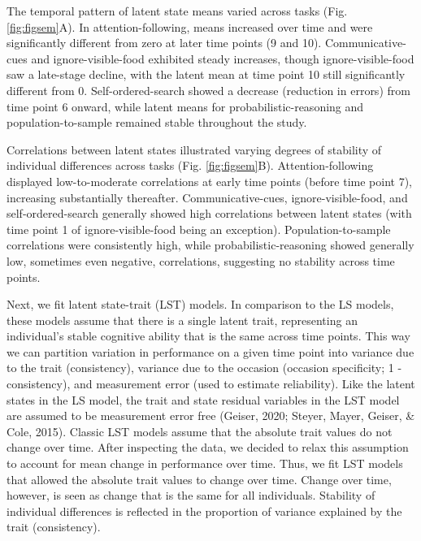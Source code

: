 \documentclass[
  man,floatsintext]{apa6}
\begin{document}
The temporal pattern of latent state means varied across tasks (Fig. \ref{fig:figsem}A). In attention-following, means increased over time and were significantly different from zero at later time points (9 and 10). Communicative-cues and ignore-visible-food exhibited steady increases, though ignore-visible-food saw a late-stage decline, with the latent mean at time point 10 still significantly different from 0. Self-ordered-search showed a decrease (reduction in errors) from time point 6 onward, while latent means for probabilistic-reasoning and population-to-sample remained stable throughout the study.

Correlations between latent states illustrated varying degrees of stability of individual differences across tasks (Fig. \ref{fig:figsem}B). Attention-following displayed low-to-moderate correlations at early time points (before time point 7), increasing substantially thereafter. Communicative-cues, ignore-visible-food, and self-ordered-search generally showed high correlations between latent states (with time point 1 of ignore-visible-food being an exception). Population-to-sample correlations were consistently high, while probabilistic-reasoning showed generally low, sometimes even negative, correlations, suggesting no stability across time points.

Next, we fit latent state-trait (LST) models. In comparison to the LS models, these models assume that there is a single latent trait, representing an individual's stable cognitive ability that is the same across time points. This way we can partition variation in performance on a given time point into variance due to the trait (consistency), variance due to the occasion (occasion specificity; 1 - consistency), and measurement error (used to estimate reliability). Like the latent states in the LS model, the trait and state residual variables in the LST model are assumed to be measurement error free (Geiser, 2020; Steyer, Mayer, Geiser, \& Cole, 2015). Classic LST models assume that the absolute trait values do not change over time. After inspecting the data, we decided to relax this assumption to account for mean change in performance over time. Thus, we fit LST models that allowed the absolute trait values to change over time. Change over time, however, is seen as change that is the same for all individuals. Stability of individual differences is reflected in the proportion of variance explained by the trait (consistency).
\end{document}

